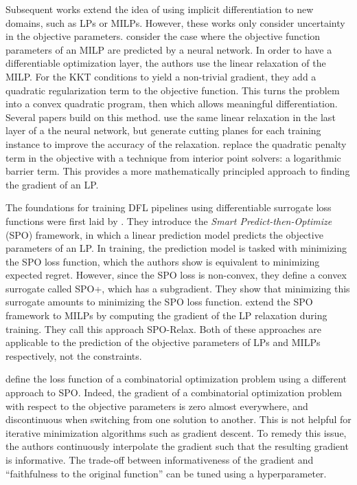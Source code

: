 Subsequent works extend the idea of using implicit differentiation to new domains, such as LPs or MILPs. However, these works only consider uncertainty in the objective parameters. \cite{wilderMeldingDataDecisionsPipeline2018} consider the case where the objective function parameters of an MILP are predicted by a neural network. In order to have a differentiable optimization layer, the authors use the linear relaxation of the MILP. For the KKT conditions to yield a non-trivial gradient, they add a quadratic regularization term to the objective function. This turns the problem into a convex quadratic program, then which allows meaningful differentiation. Several papers build on this method. \cite{ferberMIPaaLMixedInteger2020} use the same linear relaxation in the last layer of a the neural network, but generate cutting planes for each training instance to improve the accuracy of the relaxation. \cite{mandiInteriorPointSolving2020} replace the quadratic penalty term in the objective with a technique from interior point solvers: a logarithmic barrier term. This provides a more mathematically principled approach to finding the gradient of an LP.

The foundations for training DFL pipelines using differentiable surrogate loss functions were first laid by \cite{elmachtoubSmartPredictThen2022}. They introduce the \textit{Smart Predict-then-Optimize} (SPO) framework, in which a linear prediction model predicts the objective parameters of an LP. In training, the prediction model is tasked with minimizing the SPO loss function, which the authors show is equivalent to minimizing expected regret. However, since the SPO loss is non-convex, they define a convex surrogate called SPO+, which has a subgradient. They show that minimizing this surrogate amounts to minimizing the SPO loss function. \cite{mandiSmartPredictandOptimizeHard2019} extend the SPO framework to MILPs by computing the gradient of the LP relaxation during training. They call this approach SPO-Relax. Both of these approaches are applicable to the prediction of the objective parameters of LPs and MILPs respectively, not the constraints. 

\cite{pogancicDifferentiationBlackboxCombinatorial2020} define the loss function of a combinatorial optimization problem using a different approach to SPO. Indeed, the gradient of a combinatorial optimization problem with respect to the objective parameters is zero almost everywhere, and discontinuous when switching from one solution to another. This is not helpful for iterative minimization algorithms such as gradient descent. To remedy this issue, the authors continuously interpolate the gradient such that the resulting gradient is informative. The trade-off between informativeness of the gradient and ``faithfulness to the original function'' can be tuned using a hyperparameter.

